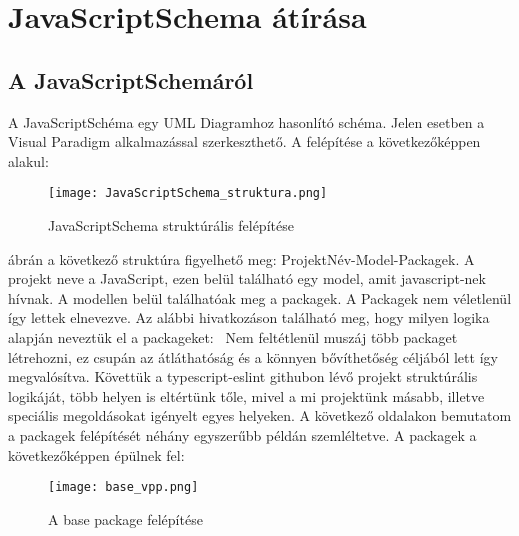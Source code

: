 \chapter{JavaScriptSchema átírása}\label{chap:JavaScriptSchema átírása}

\section{A JavaScriptSchemáról}

\noindent

A JavaScriptSchéma egy UML Diagramhoz hasonlító schéma. Jelen esetben a Visual Paradigm alkalmazással szerkeszthető.
A felépítése a következőképpen alakul:

\begin{figure}[!htbp]
      \caption{JavaScriptSchema struktúrális felépítése}\label{fig:JavaScriptSchema_struktura}
      \centering
      \texttt{[image: JavaScriptSchema\_struktura.png]}
\end{figure}

 ábrán a következő struktúra figyelhető meg: ProjektNév-Model-Packagek.
A projekt neve a JavaScript, ezen belül található egy model, amit javascript-nek hívnak. A modellen belül találhatóak meg a packagek.
A Packagek nem véletlenül így lettek elnevezve. Az alábbi hivatkozáson található meg, hogy milyen logika alapján neveztük el a packageket:~\cite{typescript-eslint}
Nem feltétlenül muszáj több packaget létrehozni, ez csupán az átláthatóság és a könnyen bővíthetőség céljából lett így megvalósítva.
Követtük a typescript-eslint githubon lévő projekt struktúrális logikáját, több helyen is eltértünk tőle, mivel a mi projektünk másabb, illetve speciális megoldásokat igényelt egyes helyeken.
A következő oldalakon bemutatom a packagek felépítését néhány egyszerűbb példán szemléltetve.
A packagek a következőképpen épülnek fel:
\begin{figure}[!htbp]
      \caption{A base package felépítése}\label{fig:base_vpp}
      \centering
      \texttt{[image: base\_vpp.png]}
\end{figure}

